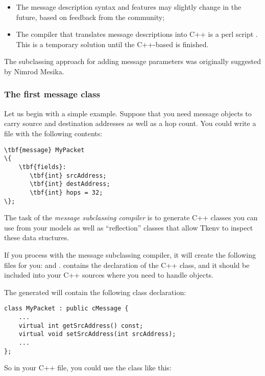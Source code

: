 \begin{itemize}
  \item The message description syntax and features may slightly change
    in the future, based on feedback from the community;
  \item The compiler that translates message descriptions into C++ is
    a perl script . This is a temporary solution until
    the C++-based  is finished.
\end{itemize}

The subclassing approach for adding message parameters was originally
suggested by Nimrod Mesika.


\subsubsection{The first message class}

Let us begin with a simple example. Suppose that you need message objects to
carry source and destination addresses as well as a hop count. You could write
a  file with the following contents:

\begin{Verbatim}[commandchars=\\\{\}]
\tbf{message} MyPacket
\{
    \tbf{fields}:
       \tbf{int} srcAddress;
       \tbf{int} destAddress;
       \tbf{int} hops = 32;
\};
\end{Verbatim}

The task of the \textit{message subclassing compiler} is to generate C++ classes
you can use from your models as well as ``reflection'' classes that allow
Tkenv to inspect these data stuctures.

If you process  with the message subclassing compiler, it will
create the following files for you:  and .
 contains the declaration of the  C++ class, and
it should be included into your C++ sources where you need to handle
 objects.

The generated  will contain the following class declaration:

\begin{verbatim}
class MyPacket : public cMessage {
    ...
    virtual int getSrcAddress() const;
    virtual void setSrcAddress(int srcAddress);
    ...
};
\end{verbatim}

So in your C++ file, you could use the  class like this:

